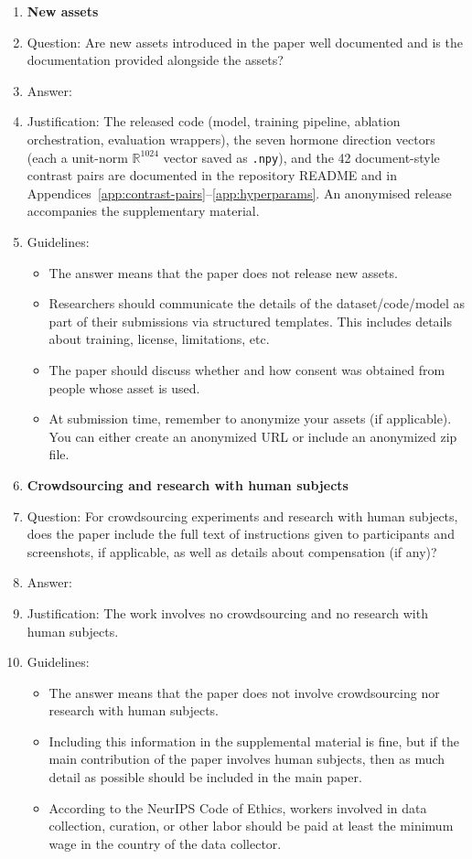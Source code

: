 \begin{enumerate}
\item {\bf New assets}
    \item[] Question: Are new assets introduced in the paper well documented and is the documentation provided alongside the assets?
    \item[] Answer: \answerYes{}
    \item[] Justification: The released code (model, training pipeline, ablation orchestration, evaluation wrappers), the seven hormone direction vectors (each a unit-norm $\mathbb{R}^{1024}$ vector saved as \texttt{.npy}), and the 42 document-style contrast pairs are documented in the repository README and in Appendices~\ref{app:contrast-pairs}--\ref{app:hyperparams}. An anonymised release accompanies the supplementary material.
    \item[] Guidelines:
    \begin{itemize}
        \item The answer \answerNA{} means that the paper does not release new assets.
        \item Researchers should communicate the details of the dataset\slash code\slash model as part of their submissions via structured templates. This includes details about training, license, limitations, etc. 
        \item The paper should discuss whether and how consent was obtained from people whose asset is used.
        \item At submission time, remember to anonymize your assets (if applicable). You can either create an anonymized URL or include an anonymized zip file.
    \end{itemize}

\item {\bf Crowdsourcing and research with human subjects}
    \item[] Question: For crowdsourcing experiments and research with human subjects, does the paper include the full text of instructions given to participants and screenshots, if applicable, as well as details about compensation (if any)?
    \item[] Answer: \answerNA{}
    \item[] Justification: The work involves no crowdsourcing and no research with human subjects.
    \item[] Guidelines:
    \begin{itemize}
        \item The answer \answerNA{} means that the paper does not involve crowdsourcing nor research with human subjects.
        \item Including this information in the supplemental material is fine, but if the main contribution of the paper involves human subjects, then as much detail as possible should be included in the main paper. 
        \item According to the NeurIPS Code of Ethics, workers involved in data collection, curation, or other labor should be paid at least the minimum wage in the country of the data collector. 
    \end{itemize}


\end{enumerate}
